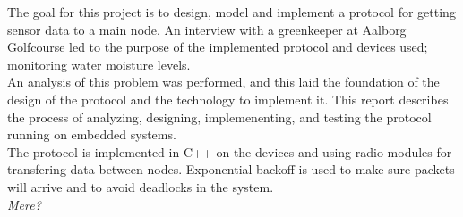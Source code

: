 The goal for this project is to design, model and implement a protocol for getting sensor data to a main node. An interview with a greenkeeper at Aalborg Golfcourse led to the purpose of the implemented protocol and devices used; monitoring water moisture levels. \\
An analysis of this problem was performed, and this laid the foundation of the design of the protocol and the technology to implement it.
This report describes the process of analyzing, designing, implemenenting, and testing the protocol running on embedded systems. \\
The protocol is implemented in C++ on the devices and using radio modules for transfering data between nodes. Exponential backoff is used to make sure packets will arrive and to avoid deadlocks in the system. \\
\textit{Mere?}